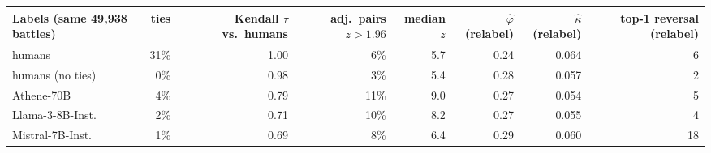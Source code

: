 \begin{tabular}{lrrrrrrr}\toprule
Labels (same 49,938 battles) & ties & Kendall $\tau$ vs.\ humans & adj.\ pairs $z{>}1.96$ & median $z$ & $\hat\varphi$ (relabel) & $\hat\kappa$ (relabel) & top-1 reversal (relabel) \\\midrule
humans & 31\% & 1.00 & 6\% & 5.7 & 0.24 & 0.064 & 6 \\
humans (no ties) & 0\% & 0.98 & 3\% & 5.4 & 0.28 & 0.057 & 2 \\
Athene-70B & 4\% & 0.79 & 11\% & 9.0 & 0.27 & 0.054 & 5 \\
Llama-3-8B-Inst. & 2\% & 0.71 & 10\% & 8.2 & 0.27 & 0.055 & 4 \\
Mistral-7B-Inst. & 1\% & 0.69 & 8\% & 6.4 & 0.29 & 0.060 & 18 \\
\bottomrule\end{tabular}
